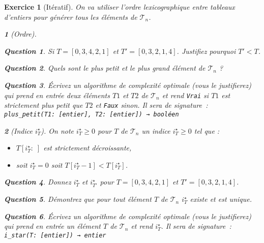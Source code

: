 \documentclass{article}
\theoremstyle{exostyle}
\newtheorem{exo}{Exercice}
\theoremstyle{partiestyle}
\newtheorem{partie}{}[exo]
\theoremstyle{questionstyle}
\newtheorem{questionpartie}{Question}[partie]
\begin{document}
\begin{exo}[Itératif]
    On va utiliser l'ordre lexicographique entre tableaux d'entiers pour générer tous les éléments de $\mathcal{T}_n$. 
    \begin{partie}[Ordre]
        \begin{questionpartie}
            Si $T = [0, 3, 4, 2, 1]$ et $T' = [0, 3, 2, 1 ,4]$. Justifiez pourquoi $T' < T$.
        \end{questionpartie}
        \begin{questionpartie}
            Quels sont le plus petit et le plus grand élément de $\mathcal{T}_n$ ?
        \end{questionpartie}
        \begin{questionpartie}
            Écrivez un algorithme de complexité optimale (vous le justifierez) qui prend en entrée deux éléments $T1$ et $T2$ de $\mathcal{T}_n$ et rend \verb|Vrai| si $T1$ est strictement plus petit que $T2$ et \verb|Faux| sinon. Il sera de signature~:
              \verb|plus_petit(T1: [entier], T2: [entier]) → booléen| 
        \end{questionpartie}
    \end{partie}
    \begin{partie}[Indice $i^\star_{T}$]
        On note $i^\star_{T}\geq 0$ pour $T$ de $\mathcal{T}_n$ un indice $i^\star_{T}\geq 0$ tel que :
        \begin{itemize}
            \item $T[i^\star_{T}:\;]$ est strictement décroissante,
            \item soit $i^\star_{T}=0$ soit $T[i^\star_{T}-1] < T[i^\star_{T}]$.
        \end{itemize}
        \begin{questionpartie}
            Donnez $i^\star_{T}$ et $i^\star_{T'}$ pour $T = [0, 3, 4, 2, 1]$ et $T' = [0, 3, 2, 1 ,4]$.
        \end{questionpartie}
        \begin{questionpartie}
            Démontrez que pour tout élément $T$ de $\mathcal{T}_n$ $i^\star_{T}$ existe et est unique.
        \end{questionpartie}
        \begin{questionpartie}
            Écrivez un algorithme de complexité optimale (vous le justifierez) qui prend en entrée un élément $T$ de $\mathcal{T}_n$ et rend $i^\star_{T}$. Il sera de signature~:
              \verb|i_star(T: [entier]) → entier| 
        \end{questionpartie}

\end{partie}
\end{exo}
\end{document}
